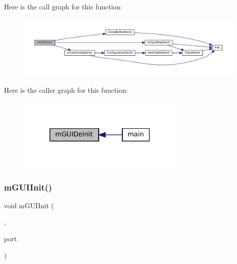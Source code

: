 Here is the call graph for this function\+:
\nopagebreak
\begin{figure}[H]
\begin{center}
\leavevmode
\includegraphics[width=350pt]{gui-runner_8h_a5d0bba06810ebab1134e6d5d26d46767_cgraph}
\end{center}
\end{figure}
Here is the caller graph for this function\+:
\nopagebreak
\begin{figure}[H]
\begin{center}
\leavevmode
\includegraphics[width=231pt]{gui-runner_8h_a5d0bba06810ebab1134e6d5d26d46767_icgraph}
\end{center}
\end{figure}
\mbox{\label{gui-runner_8h_ad34949b1a8eea99a01dd34345c87f8a4}} 
\subsubsection{\texorpdfstring{m\+G\+U\+I\+Init()}{mGUIInit()}}
{\footnotesize\ttfamily void m\+G\+U\+I\+Init (\begin{DoxyParamCaption}\item[{struct \mbox{\hyperlink{structm_g_u_i_runner}{m\+G\+U\+I\+Runner}} $\ast$}]{,  }\item[{const char $\ast$}]{port }\end{DoxyParamCaption})}

